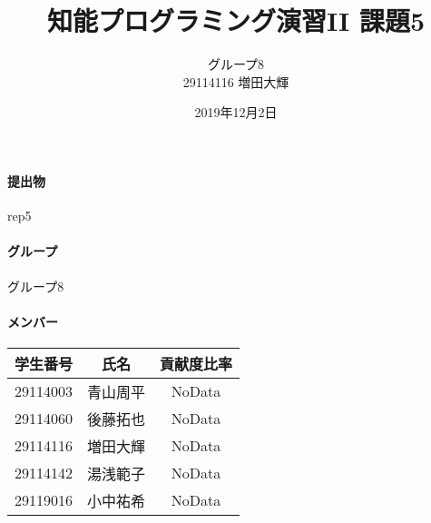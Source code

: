 \documentclass[uplatex,12pt]{jsarticle}
\title{知能プログラミング演習II 課題5}
\author{グループ8\\
  29114116 増田大輝\\
}
\date{2019年12月2日}
\begin{document}
\maketitle

\paragraph{提出物} rep5
\paragraph{グループ} グループ8

\paragraph{メンバー}
\begin{tabular}{|c|c|c|}
  \hline
  学生番号&氏名&貢献度比率\\
  \hline\hline
  29114003&青山周平&NoData\\
  \hline
  29114060&後藤拓也&NoData\\
  \hline
  29114116&増田大輝&NoData\\
  \hline
  29114142&湯浅範子&NoData\\
  \hline
  29119016&小中祐希&NoData\\
  \hline
\end{tabular}
\end{document}

